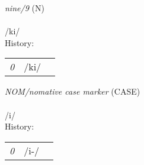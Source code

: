 \vspace{15pt}
\begin{nopagebreak}
 \textit{nine/9} (N)\\
\\
\noindent /k{\textprimstress}i/\\


\noindent History:

\vspace{-0pt}
\hspace{40pt}
\begin{tabular}{ccc}
\textit{0} & /ki/& \\
\end{tabular}

\vspace{20pt}\hline

\end{nopagebreak}
\filbreak



\vspace{15pt}
\begin{nopagebreak}
 \textit{NOM/nomative case marker} (CASE)\\
\\
\noindent /{\textprimstress}i/\\


\noindent History:

\vspace{-0pt}
\hspace{40pt}
\begin{tabular}{ccc}
\textit{0} & /i-/& \\
\end{tabular}

\vspace{20pt}\hline

\end{nopagebreak}
\filbreak



